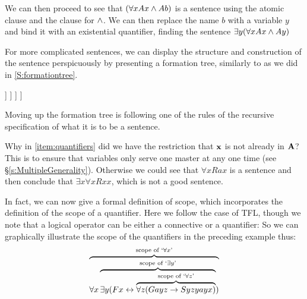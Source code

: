 	We can then proceed to see that  $(\forall x Ax\wedge Ab)$ is a sentence using the atomic clause and the clause for $\wedge$. We can then replace the name $b$ with a variable $y$ and bind it with an existential quantifier, finding the sentence $\exists y(\forall x Ax\wedge Ay)$
	
	For more complicated sentences, we can display the structure and construction of the sentence perspicuously by presenting a formation tree, similarly to as we did in
	\ref{S:formationtree}.
	
	\begin{center}
	\begin{forest}
		[$\exists z\forall y (Ryz\eand \exists x Qx)$
			[$\forall y (Ryc\eand\exists x Qx)$
				[$(Rbc\eand \exists x Qx)$
					[$Rbc$]
					[$\exists x Qx$
						[$Qa$]
					]
				]
			]
		]
	\end{forest}
	\end{center}
	Moving up the formation tree is following one of the rules of the recursive specification of what it is to be a sentence.
	
	

Why in \ref{item:quantifiers} did we have the restriction that $\mathbf{x}$ is not already in $\mathbf{A}$? This is to ensure that variables only serve one master at any one time (see \S\ref{s:MultipleGenerality}).
Otherwise we could see that $\forall x Rax$ is a sentence and then conclude that $\exists x\forall x Rxx$, which is not a good sentence. 

 In fact, we can now give a formal definition of scope, which incorporates the definition of the scope of a quantifier. Here we follow the case of TFL, though we note that a logical operator can be either a connective or a quantifier:
So we can graphically illustrate the scope of the quantifiers in the preceding example thus:
	$$\overbrace{\forall x \overbrace{\exists y (Fx \leftrightarrow \overbrace{\forall z (Gayz \rightarrow Syzyayx)}^{\text{scope of `}\forall z\text{'}}}^{\text{scope of `}\exists y\text{'}})}^{\text{scope of `$\forall x$'}}$$


